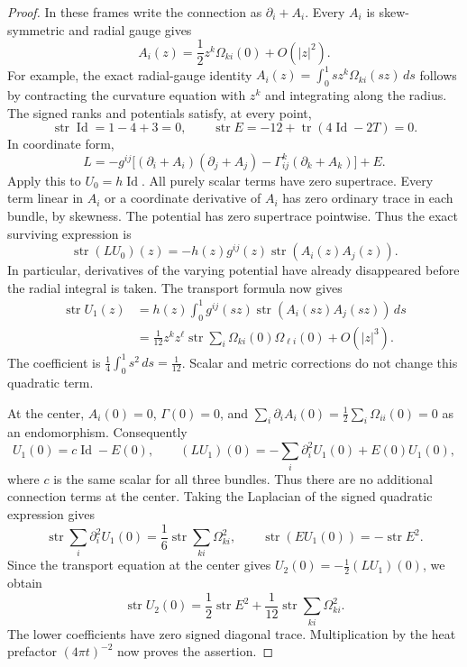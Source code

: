 \begin{proof}
In these frames write the connection as $\partial_i+A_i$.
Every $A_i$ is skew-symmetric and radial gauge gives
\[
 A_i(z)=\frac12z^k\Omega_{ki}(0)+O(|z|^2).
\]
For example, the exact radial-gauge identity
$A_i(z)=\int_0^1s z^k\Omega_{ki}(sz)\,ds$ follows by contracting
the curvature equation with $z^k$ and integrating along
the radius.
The signed ranks and potentials satisfy, at every point,
\[
 \operatorname{str}\operatorname{Id}=1-4+3=0,
 \qquad
 \operatorname{str}E=-12+\operatorname{tr}(4\operatorname{Id}-2T)=0.
\]
In coordinate form,
\[
 L=-g^{ij}\bigl[
   (\partial_i+A_i)(\partial_j+A_j)
       -\Gamma^k_{ij}(\partial_k+A_k)\bigr]+E.
\]
Apply this to $U_0=h\operatorname{Id}$. All purely scalar terms
have zero supertrace. Every term linear in $A_i$ or a
coordinate derivative of $A_i$ has zero ordinary trace in
each bundle, by skewness. The potential has zero supertrace
pointwise. Thus the exact surviving expression is
\[
 \operatorname{str}(LU_0)(z)
 =-h(z)g^{ij}(z)\operatorname{str}(A_i(z)A_j(z)).
\]
In particular, derivatives of the varying potential have
already disappeared before the radial integral is taken.
The transport formula now gives
\[
 \begin{aligned}
 \operatorname{str}U_1(z)
 &=h(z)\int_0^1 g^{ij}(sz)
              \operatorname{str}(A_i(sz)A_j(sz))\,ds\\
 &=\frac1{12}z^kz^\ell
       \operatorname{str}\sum_i\Omega_{ki}(0)\Omega_{\ell i}(0)
       +O(|z|^3).
 \end{aligned}
\]
The coefficient is
$\frac14\int_0^1s^2\,ds=\frac1{12}$.
Scalar and metric corrections do not change this quadratic term.

At the center, $A_i(0)=0$, $\Gamma(0)=0$, and
$\sum_i\partial_iA_i(0)=\frac12\sum_i\Omega_{ii}(0)=0$
as an endomorphism. Consequently
\[
 U_1(0)=c\operatorname{Id}-E(0),\qquad
 (LU_1)(0)=-\sum_i\partial_i^2U_1(0)+E(0)U_1(0),
\]
where $c$ is the same scalar for all three bundles.
Thus there are no additional connection terms at the center.
Taking the Laplacian of the signed quadratic expression gives
\[
 \operatorname{str}\sum_i\partial_i^2U_1(0)
 =\frac16\operatorname{str}\sum_{ki}\Omega_{ki}^2,
 \qquad
 \operatorname{str}(EU_1(0))=-\operatorname{str}E^2.
\]
Since the transport equation at the center gives
$U_2(0)=-\frac12(LU_1)(0)$, we obtain
\[
 \operatorname{str}U_2(0)
 =\frac12\operatorname{str}E^2
       +\frac1{12}\operatorname{str}\sum_{ki}\Omega_{ki}^2.
\]
The lower coefficients have zero signed diagonal trace.
Multiplication by the heat prefactor $(4\pi t)^{-2}$
now proves the assertion.
\end{proof}


